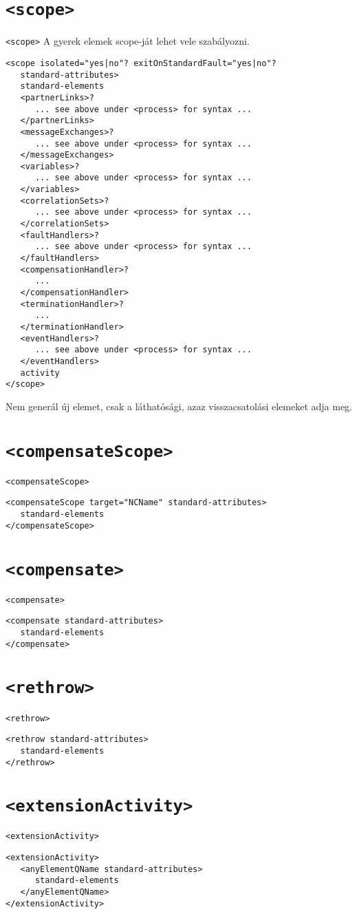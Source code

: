 \section{\texttt{<scope>}}
\texttt{<scope>} A gyerek elemek scope-ját lehet vele szabályozni.
\begin{verbatim}
<scope isolated="yes|no"? exitOnStandardFault="yes|no"?
   standard-attributes>
   standard-elements
   <partnerLinks>?
      ... see above under <process> for syntax ...
   </partnerLinks>
   <messageExchanges>?
      ... see above under <process> for syntax ...
   </messageExchanges>
   <variables>?
      ... see above under <process> for syntax ...
   </variables>
   <correlationSets>?
      ... see above under <process> for syntax ...
   </correlationSets>
   <faultHandlers>?
      ... see above under <process> for syntax ...
   </faultHandlers>
   <compensationHandler>?
      ...
   </compensationHandler>
   <terminationHandler>?
      ...
   </terminationHandler>
   <eventHandlers>?
      ... see above under <process> for syntax ...
   </eventHandlers>
   activity
</scope>
\end{verbatim}
Nem generál új elemet, csak a láthatósági, azaz visszacsatolási elemeket adja meg. 

\section{\texttt{<compensateScope>}}
\texttt{<compensateScope>}
\begin{verbatim}
<compensateScope target="NCName" standard-attributes>
   standard-elements
</compensateScope>
\end{verbatim}

\section{\texttt{<compensate>}}
\texttt{<compensate>}
\begin{verbatim}
<compensate standard-attributes>
   standard-elements
</compensate>
\end{verbatim}

\section{\texttt{<rethrow>}}
\texttt{<rethrow>}
\begin{verbatim}
<rethrow standard-attributes>
   standard-elements
</rethrow>
\end{verbatim}

\section{\texttt{<extensionActivity>}}
\texttt{<extensionActivity>}
\begin{verbatim}
<extensionActivity>
   <anyElementQName standard-attributes>
      standard-elements
   </anyElementQName>
</extensionActivity>
\end{verbatim}

